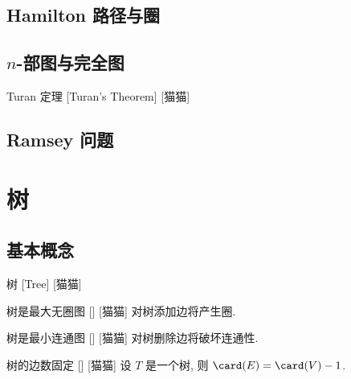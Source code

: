 \documentclass[UTF8]{ctexart}
\begin{document}
        \subsection{Hamilton 路径与圈}

        \subsection{\(n\)-部图与完全图}
            
            \begin{thm}
                []
                {Turan 定理}
                [Turan's Theorem]
                [猫猫]
            \end{thm}

        \subsection{Ramsey 问题}

    \section{树}

        \subsection{基本概念}
            
            \begin{dfn}
                []
                {树}
                [Tree]
                [猫猫]
            \end{dfn}
            
            \begin{ppt}
                []
                {树是最大无圈图}
                []
                [猫猫]
                对树添加边将产生圈. 
            \end{ppt}
            
            \begin{ppt}
                []
                {树是最小连通图}
                []
                [猫猫]
                对树删除边将破坏连通性. 
            \end{ppt}
            
            \begin{ppt}
                []
                {树的边数固定}
                []
                [猫猫]
                设 \(T\) 是一个树, 则 \(\card(E)=\card(V)-1\). 
            \end{ppt}
            
\end{document}
